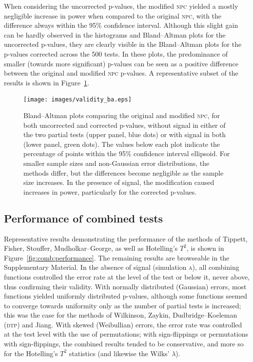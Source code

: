 When considering the uncorrected p-values, the modified \textsc{npc} yielded a mostly negligible increase in power when compared to the original \textsc{npc}, with the difference always within the 95\% confidence interval. Although this slight gain can be hardly observed in the histograms and Bland--Altman plots for the uncorrected p-values, they are clearly visible in the Bland--Altman plots for the p-values corrected across the 500 tests. In these plots, the predominance of smaller (towards more significant) p-values can be seen as a positive difference between the original and modified \textsc{npc} p-values. A representative subset of the results is shown in Figure~\ref{fig:comb:validity_ba}.

\begin{figure}[p]
\begin{center}
\centerline{\texttt{[image: images/validity\_ba.eps]}}
\end{center}
\vspace{-3mm}
\caption[Bland--Altman plots comparing original and modified \textsc{npc}.]{Bland--Altman plots comparing the original and modified \textsc{npc}, for both uncorrected and corrected p-values, without signal in either of the two partial tests (upper panel, blue dots) or with signal in both (lower panel, green dots). The values below each plot indicate the percentage of points within the 95\% confidence interval ellipsoid. For smaller sample sizes and non-Gaussian error distributions, the methods differ, but the differences become negligible as the sample size increases. In the presence of signal, the modification caused increases in power, particularly for the corrected p-values.}
\label{fig:comb:validity_ba}
\end{figure}

\subsection{Performance of combined tests}

Representative results demonstrating the performance of the methods of Tippett, Fisher, Stouffer, Mudholkar--George, as well as Hotelling's $T^2$, is shown in Figure~\ref{fig:comb:performance}. The remaining results are browseable in the Supplementary Material. In the absence of signal (simulation \textsc{a}), all combining functions controlled the error rate at the level of the test or below it, never above, thus confirming their validity. With normally distributed (Gaussian) errors, most functions yielded uniformly distributed p-values, although some functions seemed to converge towards uniformity only as the number of partial tests is increased; this was the case for the methods of Wilkinson, Zaykin, Dudbridge--Koeleman (\textsc{dtp}) and Jiang. With skewed (Weibullian) errors, the error rate was controlled at the test level with the use of permutations; with sign-flippings or permutations with sign-flippings, the combined results tended to be conservative, and more so for the Hotelling's $T^2$ statistics (and likewise the Wilks' $\lambda$).

